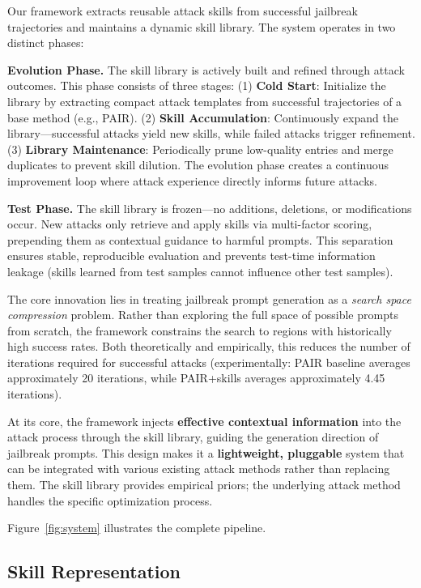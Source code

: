 \documentclass{article} %
\begin{document}
Our framework extracts reusable attack skills from successful jailbreak trajectories and maintains a dynamic skill library. The system operates in two distinct phases:

\textbf{Evolution Phase.} The skill library is actively built and refined through attack outcomes. This phase consists of three stages: (1) \textbf{Cold Start}: Initialize the library by extracting compact attack templates from successful trajectories of a base method (e.g., PAIR). (2) \textbf{Skill Accumulation}: Continuously expand the library---successful attacks yield new skills, while failed attacks trigger refinement. (3) \textbf{Library Maintenance}: Periodically prune low-quality entries and merge duplicates to prevent skill dilution. The evolution phase creates a continuous improvement loop where attack experience directly informs future attacks.

\textbf{Test Phase.} The skill library is frozen---no additions, deletions, or modifications occur. New attacks only retrieve and apply skills via multi-factor scoring, prepending them as contextual guidance to harmful prompts. This separation ensures stable, reproducible evaluation and prevents test-time information leakage (skills learned from test samples cannot influence other test samples).

The core innovation lies in treating jailbreak prompt generation as a \emph{search space compression} problem. Rather than exploring the full space of possible prompts from scratch, the framework constrains the search to regions with historically high success rates. Both theoretically and empirically, this reduces the number of iterations required for successful attacks (experimentally: PAIR baseline averages approximately 20 iterations, while PAIR+skills averages approximately 4.45 iterations).

At its core, the framework injects \textbf{effective contextual information} into the attack process through the skill library, guiding the generation direction of jailbreak prompts. This design makes it a \textbf{lightweight, pluggable} system that can be integrated with various existing attack methods rather than replacing them. The skill library provides empirical priors; the underlying attack method handles the specific optimization process.

Figure~\ref{fig:system} illustrates the complete pipeline.

\subsection{Skill Representation}
\end{document}
